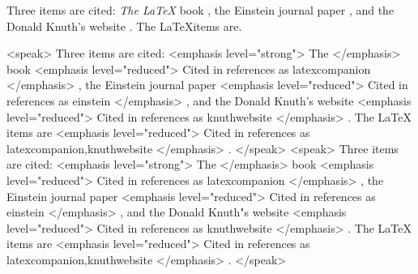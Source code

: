 Three items are cited: \textit{The \LaTeX\Companion} book \cite{latexcompanion}, the Einstein journal paper \cite{einstein}, and the Donald Knuth's website \cite{knuthwebsite}. The \LaTeX\related items are\cite{latexcompanion,knuthwebsite}.


<speak> Three items are cited: <emphasis level="strong"> The </emphasis> book <emphasis level="reduced"> Cited in references as latexcompanion </emphasis> , the Einstein journal paper <emphasis level="reduced"> Cited in references as einstein </emphasis> , and the Donald Knuth's website <emphasis level="reduced"> Cited in references as knuthwebsite </emphasis> . The LaTeX items are <emphasis level="reduced"> Cited in references as latexcompanion,knuthwebsite </emphasis> . </speak>
<speak> Three items are cited: <emphasis level="strong"> The </emphasis> book <emphasis level="reduced"> Cited in references as latexcompanion </emphasis> , the Einstein journal paper <emphasis level="reduced"> Cited in references as einstein </emphasis> , and the Donald Knuth"s website <emphasis level="reduced"> Cited in references as knuthwebsite </emphasis> . The LaTeX items are <emphasis level="reduced"> Cited in references as latexcompanion,knuthwebsite </emphasis> . </speak>